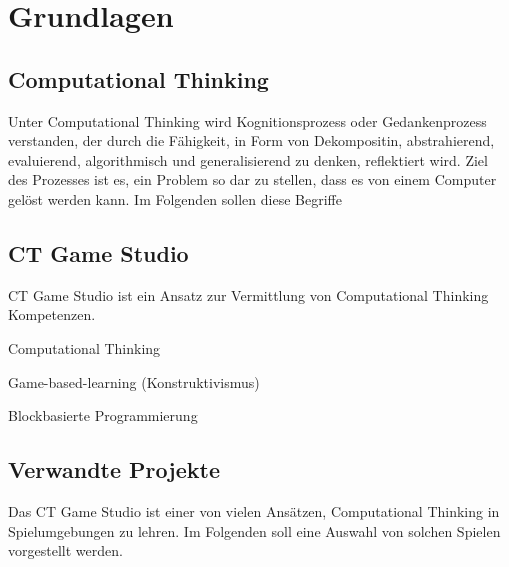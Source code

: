 \chapter{Grundlagen}

\section{Computational Thinking}


Unter Computational Thinking wird Kognitionsprozess oder Gedankenprozess verstanden, der durch die
Fähigkeit, in Form von Dekompositin, abstrahierend, evaluierend, algorithmisch und generalisierend
zu denken, reflektiert wird. Ziel des Prozesses ist es, ein Problem so dar zu stellen, dass es von
einem Computer gelöst werden kann. Im Folgenden sollen diese Begriffe


\section{CT Game Studio}

CT Game Studio ist ein Ansatz zur Vermittlung von Computational Thinking Kompetenzen.

Computational Thinking

Game-based-learning (Konstruktivismus)

Blockbasierte Programmierung


\section{Verwandte Projekte}

Das CT Game Studio ist einer von vielen Ansätzen, Computational Thinking in Spielumgebungen zu
lehren. Im Folgenden soll eine Auswahl von solchen Spielen vorgestellt werden.


